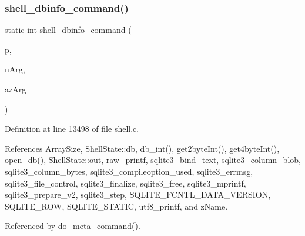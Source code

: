 \mbox{\label{shell_8c_ae14540c85a0c98d51e624a74a054cd50}} 
\subsubsection{shell\+\_\+dbinfo\+\_\+command()}
{\footnotesize\ttfamily static int shell\+\_\+dbinfo\+\_\+command (\begin{DoxyParamCaption}\item[{\textbf{ Shell\+State} $\ast$}]{p,  }\item[{int}]{n\+Arg,  }\item[{char $\ast$$\ast$}]{az\+Arg }\end{DoxyParamCaption})\hspace{0.3cm}{\ttfamily [static]}}



Definition at line 13498 of file shell.\+c.



References Array\+Size, Shell\+State\+::db, db\+\_\+int(), get2byte\+Int(), get4byte\+Int(), open\+\_\+db(), Shell\+State\+::out, raw\+\_\+printf, sqlite3\+\_\+bind\+\_\+text, sqlite3\+\_\+column\+\_\+blob, sqlite3\+\_\+column\+\_\+bytes, sqlite3\+\_\+compileoption\+\_\+used, sqlite3\+\_\+errmsg, sqlite3\+\_\+file\+\_\+control, sqlite3\+\_\+finalize, sqlite3\+\_\+free, sqlite3\+\_\+mprintf, sqlite3\+\_\+prepare\+\_\+v2, sqlite3\+\_\+step, S\+Q\+L\+I\+T\+E\+\_\+\+F\+C\+N\+T\+L\+\_\+\+D\+A\+T\+A\+\_\+\+V\+E\+R\+S\+I\+ON, S\+Q\+L\+I\+T\+E\+\_\+\+R\+OW, S\+Q\+L\+I\+T\+E\+\_\+\+S\+T\+A\+T\+IC, utf8\+\_\+printf, and z\+Name.



Referenced by do\+\_\+meta\+\_\+command().


